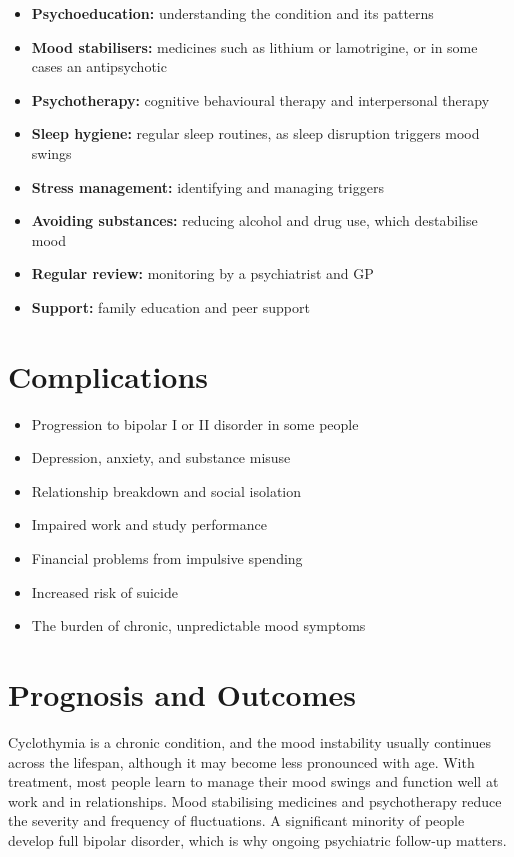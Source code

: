 \begin{itemize}
    \item \textbf{Psychoeducation:} understanding the condition and its patterns
    \item \textbf{Mood stabilisers:} medicines such as lithium or lamotrigine, or in some cases an antipsychotic
    \item \textbf{Psychotherapy:} cognitive behavioural therapy and interpersonal therapy
    \item \textbf{Sleep hygiene:} regular sleep routines, as sleep disruption triggers mood swings
    \item \textbf{Stress management:} identifying and managing triggers
    \item \textbf{Avoiding substances:} reducing alcohol and drug use, which destabilise mood
    \item \textbf{Regular review:} monitoring by a psychiatrist and GP
    \item \textbf{Support:} family education and peer support
\end{itemize}

\section*{Complications}
\begin{itemize}
    \item Progression to bipolar I or II disorder in some people
    \item Depression, anxiety, and substance misuse
    \item Relationship breakdown and social isolation
    \item Impaired work and study performance
    \item Financial problems from impulsive spending
    \item Increased risk of suicide
    \item The burden of chronic, unpredictable mood symptoms
\end{itemize}

\section*{Prognosis and Outcomes}
Cyclothymia is a chronic condition, and the mood instability usually continues across the lifespan, although it may become less pronounced with age. With treatment, most people learn to manage their mood swings and function well at work and in relationships. Mood stabilising medicines and psychotherapy reduce the severity and frequency of fluctuations. A significant minority of people develop full bipolar disorder, which is why ongoing psychiatric follow-up matters.

